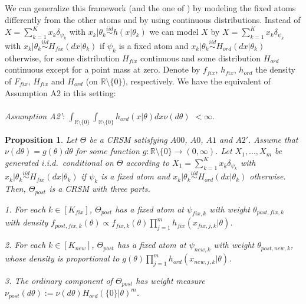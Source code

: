 \documentclass{article}
\theoremstyle{plain}
\newtheorem{proposition}[theorem]{Proposition}
\theoremstyle{remark}
\begin{document}
We can generalize this framework (and the one of \citet{Bro1}) by modeling the fixed atoms differently from the other atoms and by using continuous distributions. Instead of $X=\sum_{k=1}^{K}x_{k}\delta_{\psi_{k}}$ with $x_{k}|\theta_k\stackrel{iid}{\sim} h(x|\theta_{k})$ we can model $X$ by $X=\sum_{k=1}^{K}x_{k}\delta_{\psi_{k}}$ with $x_{k}|\theta_k\stackrel{iid}{\sim} H_{fix}(dx|\theta_{k})$ if $\psi_{k}$ is a fixed atom and $x_{k}|\theta_k\stackrel{iid}{\sim} H_{ord}(dx|\theta_{k})$ otherwise, for some distribution $H_{fix}$ continuous and some distribution $H_{ord}$ continuous except for a point mass at zero. Denote by $f_{fix}$, $h_{fix}$, $h_{ord}$ the density of $F_{fix}$, $H_{fix}$ and $H_{ord}$ (on $\mathbb{R}\setminus\{0\}$), respectively. We have the equivalent of Assumption A2 in this setting:
\\\\ \textit{Assumption A2'}: $\int_{\mathbb{R}\setminus\{0\}}\int_{\mathbb{R}\setminus\{0\}}h_{ord}(x|\theta)dx \nu(d\theta)$ $<\infty$.
\begin{proposition}\label{pro-Bay-2}
	Let $\Theta$ be a CRSM satisfying $A00$, $A0$, $A1$ and $A2'$. Assume that $\nu(d\theta)=g(\theta)d\theta$ for some function $g:\mathbb{R}\setminus\{0\}\to(0,\infty)$. Let $X_1,...,X_m$ be generated i.i.d.~conditional on $\Theta$ according to $X_1=\sum_{k=1}^{K}x_{k}\delta_{\psi_{k}}$ with $x_{k}|\theta_k\stackrel{iid}{\sim} H_{fix}(dx|\theta_{k})$ if $\psi_{k}$ is a fixed atom and $x_{k}|\theta_k\stackrel{iid}{\sim} H_{ord}(dx|\theta_{k})$ otherwise. Then, $\Theta_{post}$ is a CRSM with three parts.
	
	\textnormal{1.} For each $k\in [K_{fix}]$, $\Theta_{post}$ has a fixed atom at $\psi_{fix,k}$ with weight $\theta_{post,fix,k}$ with density $f_{post,fix,k} (\theta)\propto f_{fix,k} (\theta)\prod_{j=1}^m h_{fix}(x_{fix,j,k}|\theta)$.
	
	\textnormal{2.} For each $k\in [K_{new}]$, $\Theta_{post}$ has a fixed atom at $\psi_{new,k}$ with weight $\theta_{post,new,k}$, whose density is proportional to $g(\theta)\prod_{j=1}^m h_{ord}(x_{new,j,k}|\theta)$.
	
	\textnormal{3.} The ordinary component of $\Theta_{post}$ has weight measure $\nu_{post}(d\theta):=\nu(d\theta)H_{ord}(\{0\}|\theta)^m$.
\end{proposition}
\end{document}
